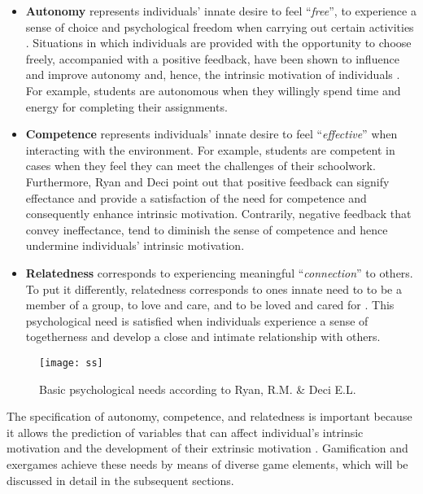 \begin{itemize}
\item \textbf{Autonomy} represents individuals' innate desire to feel ``\textit{free}'', to experience a sense of choice and psychological freedom when carrying out certain activities \cite{deci2000and}. Situations in which individuals are provided with the opportunity to choose freely, accompanied with a positive feedback, have been shown to influence and improve autonomy and, hence, the intrinsic motivation of individuals \cite{ryan2000self}. For example, students are  autonomous when they willingly spend time and energy for completing their assignments. 
\item \textbf{Competence} represents individuals' innate desire to feel ``\textit{effective}'' when interacting with the environment. For example, students are competent in cases when they feel they can meet the challenges of their schoolwork. Furthermore, Ryan and Deci point out that positive feedback can signify effectance and provide a satisfaction of the need for competence and consequently enhance intrinsic motivation. Contrarily, negative feedback that convey ineffectance, tend to diminish the sense of competence and hence undermine individuals' intrinsic motivation. 
\item \textbf{Relatedness} corresponds to experiencing meaningful ``\textit{connection}'' to others. To put it differently, relatedness corresponds to ones innate need to to be a member of a group, to love and care, and to be loved and cared for \cite{broeck2010capturing}. This psychological need is satisfied when individuals experience a sense of togetherness and develop a close and intimate relationship with others.\\
\end{itemize}
\begin{figure}[h]
    \centering
    \texttt{[image: ss]}
    \caption{Basic psychological needs according to Ryan, R.M. \& Deci E.L. \cite{deci1994promoting} }
    \label{fig:ss}
\end{figure}
The specification of autonomy, competence, and relatedness is important because it allows the prediction of variables that can affect individual's intrinsic motivation and the development of their extrinsic motivation \cite{deci1994promoting}. Gamification and exergames achieve these needs by means of diverse game elements, which will be discussed in detail in the subsequent sections.\\\\
